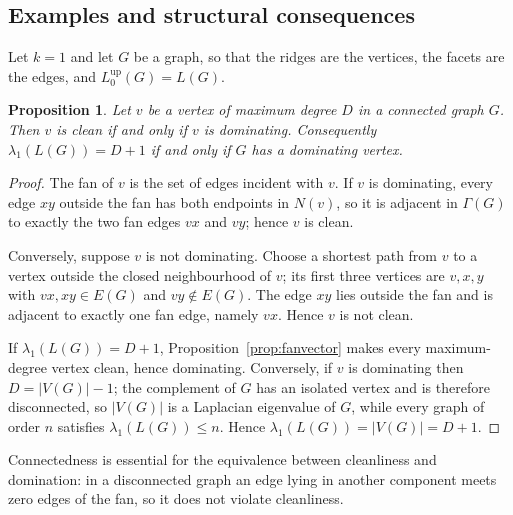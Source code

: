 \documentclass[11pt,reqno]{amsart}
\numberwithin{equation}{section}
\theoremstyle{plain}
\newtheorem{proposition}[theorem]{Proposition}
\theoremstyle{definition}
\newcommand{\Lup}{L^{\mathrm{up}}}
\begin{document}
\subsection{Examples and structural consequences}

Let $k=1$ and let $G$ be a graph, so that the ridges are the vertices, the facets are the edges,
and $\Lup_0(G)=L(G)$.

\begin{proposition}\label{prop:dominating}
Let $v$ be a vertex of maximum degree $D$ in a connected graph $G$. Then $v$ is clean if and only
if $v$ is dominating. Consequently $\lambda_1(L(G))=D+1$ if and only if $G$ has a dominating
vertex.
\end{proposition}

\begin{proof}
The fan of $v$ is the set of edges incident with $v$. If $v$ is dominating, every edge $xy$
outside the fan has both endpoints in $N(v)$, so it is adjacent in $\Gamma(G)$ to exactly the two
fan edges $vx$ and $vy$; hence $v$ is clean.

Conversely, suppose $v$ is not dominating. Choose a shortest path from $v$ to a vertex outside
the closed neighbourhood of $v$; its first three vertices are $v,x,y$ with $vx,xy\in E(G)$ and
$vy\notin E(G)$. The edge $xy$ lies outside the fan and is adjacent to exactly one fan edge,
namely $vx$. Hence $v$ is not clean.

If $\lambda_1(L(G))=D+1$, Proposition~\ref{prop:fanvector} makes every maximum-degree vertex
clean, hence dominating. Conversely, if $v$ is dominating then $D=|V(G)|-1$; the complement of
$G$ has an isolated vertex and is therefore disconnected, so $|V(G)|$ is a Laplacian eigenvalue
of $G$, while every graph of order $n$ satisfies $\lambda_1(L(G))\le n$. Hence
$\lambda_1(L(G))=|V(G)|=D+1$.
\end{proof}

Connectedness is essential for the equivalence between cleanliness and domination: in a
disconnected graph an edge lying in another component meets zero edges of the fan, so it does not
violate cleanliness.
\end{document}

